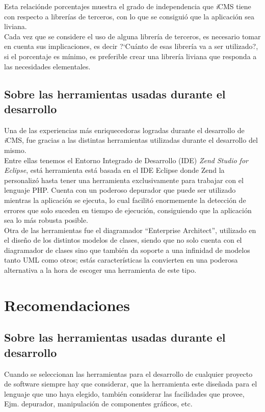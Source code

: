 Esta relaci\'onde porcentajes muestra el grado de independencia que \textit{i}CMS tiene con respecto a librer\'ias de terceros, con lo que se consigui\'o que la aplicaci\'on sea liviana.\\

Cada vez que se considere el uso de alguna librer\'ia de terceros, es necesario tomar en cuenta sus implicaciones, es decir ?`Cu\'anto de esas librer\'ia va a ser utilizado?, si el porcentaje es m\'inimo, es preferible crear una librer\'ia liviana que responda a las necesidades elementales.\\

\subsection{Sobre las herramientas usadas durante el desarrollo}
Una de las experiencias m\'as enriquecedoras logradas durante el desarrollo de \textit{i}CMS, fue gracias a las distintas herramientas utilizadas durante el desarrollo del mismo.\\

Entre ellas tenemos el Entorno Integrado de Desarrollo (IDE) \emph{Zend Studio for Eclipse}, est\'a herramienta est\'a basada en el IDE Eclipse donde Zend la personaliz\'o hasta tener una herramienta exclusivamente para trabajar con el lenguaje PHP. Cuenta con un poderoso depurador que puede ser utilizado mientras la aplicaci\'on se ejecuta, lo cual facilit\'o enormemente la detecci\'on de errores que solo suceden en tiempo de ejecuci\'on, consiguiendo que la aplicaci\'on sea lo m\'as robusta posible.\\

Otra de las herramientas fue el diagramador ``Enterprise Architect'', utilizado en el dise\~no de los distintos modelos de clases, siendo que no solo cuenta con el diagramador de clases sino que tambi\'en da soporte a una infinidad de modelos tanto UML como otros; est\'as caracter\'isticas la convierten en una poderosa alternativa a la hora de escoger una herramienta de este tipo.\\

\section{Recomendaciones}

\subsection{Sobre las herramientas usadas durante el desarrollo}
Cuando se seleccionan las herramientas para el desarrollo de cualquier proyecto de software siempre hay que considerar, que la herramienta este dise\~nada para el lenguaje que uno haya elegido, tambi\'en considerar las facilidades que provee, Ejm. depurador, manipulaci\'on de componentes gr\'aficos, etc.


